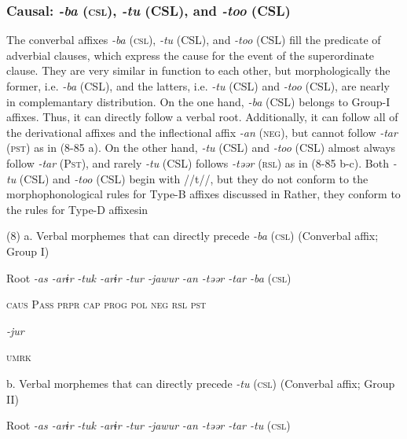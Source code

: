 \subsubsection{Causal: \textit{{}-ba} (\textsc{csl}), \textit{{}-tu} (CSL), and \textit{{}-too} (CSL)}

The converbal affixes \textit{{}-ba} (\textsc{csl}), \textit{{}-tu} (CSL), and \textit{{}-too} (CSL) fill the predicate of adverbial clauses, which express the cause for the event of the superordinate clause. They are very similar in function to each other, but morphologically the former, i.e. \textit{{}-ba} (CSL), and the latters, i.e. \textit{{}-tu} (CSL) and \textit{{}-too} (CSL), are nearly in complemantary distribution. On the one hand, \textit{{}-ba} (CSL) belongs to Group-I affixes. Thus, it can directly follow a verbal root. Additionally, it can follow all of the derivational affixes and the inflectional affix \textit{{}-an} (\textsc{neg}), but cannot follow \textit{{}-tar} (\textsc{pst}) as in (8-85 a). On the other hand, \textit{{}-tu} (CSL) and \textit{{}-too} (CSL) almost always follow \textit{{}-tar} (P\textsc{st}), and rarely \textit{{}-tu} (CSL) follows \textit{{}-təər} (\textsc{rsl}) as in (8-85 b-c). Both \textit{-tu} (CSL) and \textit{{}-too} (CSL) begin with //t//, but they do not conform to the morphophonological rules for Type-B affixes discussed in  Rather, they conform to the rules for Type-D affixesin 

(8)  a. Verbal morphemes that can directly precede \textit{{}-ba} (\textsc{csl}) (Converbal affix; Group I)

  Root  \textit{{}-as  {}-arɨr} %
\textit{{}-tuk  {}-arɨr  {}-tur  {}-jawur} %
\textit{{}-an  {}-təər  {}-tar  {}-ba} (\textsc{csl})

    \textsc{caus}  P\textsc{ass}  \textsc{prpr}  \textsc{cap}  \textsc{prog}  \textsc{pol}  \textsc{neg}  \textsc{rsl}  \textsc{pst}

          \textit{{}-jur} 

          \textsc{umrk}

  b. Verbal morphemes that can directly precede \textit{{}-tu} (\textsc{csl}) (Converbal affix; Group II)

  Root  \textit{{}-as  {}-arɨr} %
\textit{{}-tuk  {}-arɨr  {}-tur  {}-jawur} %
\textit{{}-an  {}-təər  {}-tar  {}-tu} (\textsc{csl})

